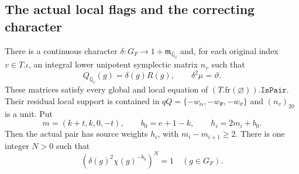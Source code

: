 \subsection{The actual local flags and the correcting character}

\begin{proposition}
\label{claim:SX5}
There is a continuous character $\delta:G_F\to1+\mathfrak m_{\bar{\mathbb Q}_\ell}$
and, for each original index $v\in T.\iota$, an integral lower
unipotent symplectic matrix $n_v$ such that
\[
        Q_{\bar{\mathbb Q}_\ell}(g)=\delta(g)R(g),
        \qquad\delta^2\mu=\vartheta.              \tag{SX.19}
\]
These matrices satisfy every global and local equation of
$(T.\mathrm{fr}(\varnothing)).\texttt{IsPair}$.
Their residual local support is contained in
$qQ=\{-w_\alpha,-w_\Psi,-w_\vartheta\}$ and
$(n_v)_{20}$ is a unit.  Put
\[
 m=(k+t,k,0,-t),\qquad b_0=e+1-k,\qquad h_i=2m_i+b_0.
                                                            \tag{SX.20}
\]
Then the actual pair has source weights $h_i$, with
$m_i-m_{i+1}\ge2$.  There is one integer $N>0$ such that
\[
                (\delta(g)^2\chi(g)^{-b_0})^N=1
                         \quad(g\in G_F).          \tag{SX.21}
\]
\end{proposition}
